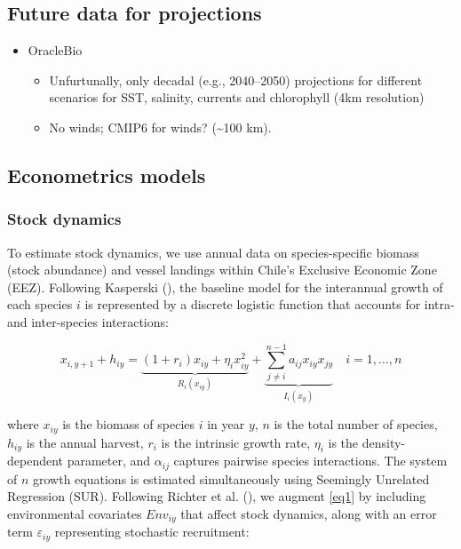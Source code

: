 \documentclass[
  11pt,
]{article}
\providecommand{\tightlist}{%
  \setlength{\itemsep}{0pt}\setlength{\parskip}{0pt}}
\begin{document}
\subsection{Future data for projections}\label{future-data-for-projections}

\begin{itemize}
\tightlist
\item
  OracleBio

  \begin{itemize}
  \tightlist
  \item
    Unfurtunally, only decadal (e.g., 2040--2050) projections for
    different scenarios for SST, salinity, currents and chlorophyll
    (4km resolution)
  \item
    No winds; CMIP6 for winds? (\textasciitilde100 km).
  \end{itemize}
\end{itemize}

\subsection{Econometrics models}\label{econometrics-models}

\subsubsection{Stock dynamics}\label{stock-dynamics}

To estimate stock dynamics, we use annual data on species-specific biomass (stock abundance) and vessel landings within Chile's Exclusive Economic Zone (EEZ). Following Kasperski (), the baseline model for the interannual growth of each species \(i\) is represented by a discrete logistic function that accounts for intra- and inter-species interactions:

\begin{equation}
x_{i,y+1} + h_{iy} = \underbrace{(1 + r_i)x_{iy} + \eta_i x_{iy}^2}_{R_i(x_{iy})} + \underbrace{\sum_{j \neq i}^{n-1} a_{ij} x_{iy} x_{jy}}_{I_i(x_y)} \quad i=1,\ldots,n
\label{eq1}
\end{equation}

where \(x_{iy}\) is the biomass of species \(i\) in year \(y\), \(n\) is the total number of species, \(h_{iy}\) is the annual harvest, \(r_i\) is the intrinsic growth rate, \(\eta_i\) is the density-dependent parameter, and \(\alpha_{ij}\) captures pairwise species interactions. The system of \(n\) growth equations is estimated simultaneously using Seemingly Unrelated Regression (SUR). Following Richter et al. (), we augment \eqref{eq1} by including environmental covariates \(Env_{iy}\) that affect stock dynamics, along with an error term \(\varepsilon_{iy}\) representing stochastic recruitment:
\end{document}
